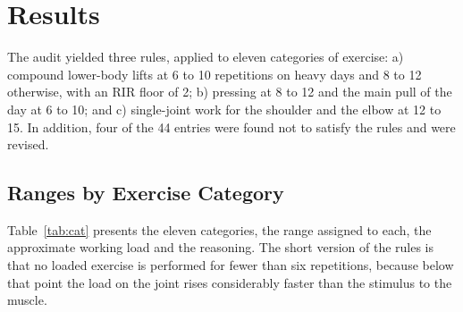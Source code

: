 \documentclass[11pt,a4paper]{article}
\begin{document}
\section*{Results}

The audit yielded three rules, applied to eleven categories of exercise: a) compound lower-body lifts at 6 to 10 repetitions on heavy days and 8 to 12 otherwise, with an RIR floor of 2; b) pressing at 8 to 12 and the main pull of the day at 6 to 10; and c) single-joint work for the shoulder and the elbow at 12 to 15. In addition, four of the 44 entries were found not to satisfy the rules and were revised.

\subsection*{Ranges by Exercise Category}

Table~\ref{tab:cat} presents the eleven categories, the range assigned to each, the approximate working load and the reasoning. The short version of the rules is that no loaded exercise is performed for fewer than six repetitions, because below that point the load on the joint rises considerably faster than the stimulus to the muscle.
\end{document}

